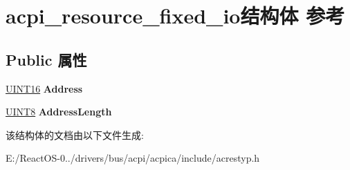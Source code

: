 \hypertarget{structacpi__resource__fixed__io}{}\section{acpi\+\_\+resource\+\_\+fixed\+\_\+io结构体 参考}
\label{structacpi__resource__fixed__io}
\subsection*{Public 属性}
\begin{DoxyCompactItemize}
\item 
\mbox{\label{structacpi__resource__fixed__io_a9cb6c36ba4688a62575dd0d518e4e986}} 
\hyperlink{_processor_bind_8h_a09f1a1fb2293e33483cc8d44aefb1eb1}{U\+I\+N\+T16} {\bfseries Address}
\item 
\mbox{\label{structacpi__resource__fixed__io_a66fc45bff134eaec847320e2b8d51987}} 
\hyperlink{_processor_bind_8h_ab27e9918b538ce9d8ca692479b375b6a}{U\+I\+N\+T8} {\bfseries Address\+Length}
\end{DoxyCompactItemize}


该结构体的文档由以下文件生成\+:\begin{DoxyCompactItemize}
\item 
E\+:/\+React\+O\+S-\/0../drivers/bus/acpi/acpica/include/acrestyp.\+h\end{DoxyCompactItemize}
